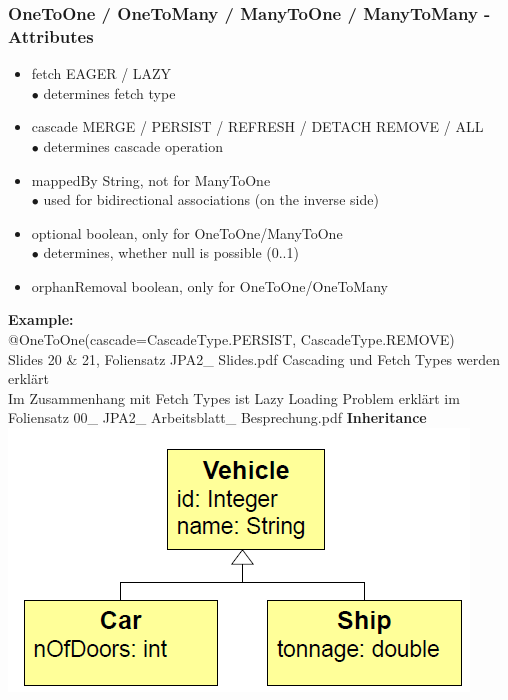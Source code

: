 \documentclass[10pt]{scrartcl}
\newcommand{\Bold}[1]{\textbf{#1}} %
\begin{document}
\subsubsection*{OneToOne / OneToMany / ManyToOne / ManyToMany - Attributes}
\begin{itemize}
\item fetch EAGER / LAZY\\
$\bullet$ determines fetch type
\item cascade MERGE / PERSIST / REFRESH / DETACH REMOVE / ALL\\
$\bullet$ determines cascade operation
\item mappedBy String, not for ManyToOne\\
$\bullet$ used for bidirectional associations (on the inverse side)
\item optional boolean, only for OneToOne/ManyToOne\\
$\bullet$ determines, whether null is possible (0..1)
\item orphanRemoval boolean, only for OneToOne/OneToMany
\end{itemize}
\Bold{Example:}\\
@OneToOne(cascade={CascadeType.PERSIST, CascadeType.REMOVE})\\
Slides 20 \& 21, Foliensatz JPA2\_ Slides.pdf Cascading und Fetch Types werden erklärt\\
Im Zusammenhang mit Fetch Types ist Lazy Loading Problem erklärt im Foliensatz 00\_ JPA2\_ Arbeitsblatt\_ Besprechung.pdf
\Bold{Inheritance}\\
\includegraphics[scale=0.5]{inheritance.png}
\end{document}
